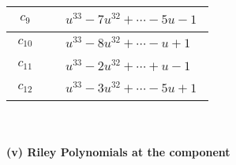 \documentclass[1p]{elsarticle_modified}
\theoremstyle{definition}
\begin{document}
\begin{tabular}{m{50pt}|m{274pt}}
\hline $$\begin{aligned}c_{9}\end{aligned}$$&$\begin{aligned}
&u^{33}-7 u^{32}+\cdots-5 u-1
\end{aligned}$\\
\hline $$\begin{aligned}c_{10}\end{aligned}$$&$\begin{aligned}
&u^{33}-8 u^{32}+\cdots- u+1
\end{aligned}$\\
\hline $$\begin{aligned}c_{11}\end{aligned}$$&$\begin{aligned}
&u^{33}-2 u^{32}+\cdots+u-1
\end{aligned}$\\
\hline $$\begin{aligned}c_{12}\end{aligned}$$&$\begin{aligned}
&u^{33}-3 u^{32}+\cdots-5 u+1
\end{aligned}$\\
\hline
\end{tabular}\\~\\
\newpage\renewcommand{\arraystretch}{1}
\flushleft \textbf{(v) Riley Polynomials at the component}\newline \\
\end{document}
